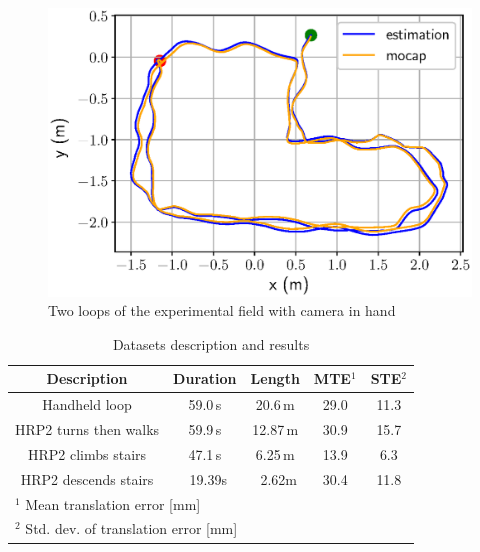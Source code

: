 \begin{figure}[t]
    \centering
    \includegraphics[scale=0.8]{figures/absolute/xy_loop_twice.eps}
    \caption{Two loops of the experimental field with camera in hand}
    \label{fig:xy_loop_twice}
\end{figure}

%
\begin{table}[t]
    \centering
    \caption{Datasets description and results}
    \begin{tabular}{c|c|c|c|c}
        Description & Duration & Length & MTE$^1$ & STE$^2$ \\
        \hline
        \hline
        Handheld loop & 59.0\,\textrm{s} & 20.6\,\textrm{m} & 29.0 & 11.3  \\
        \hline
        HRP2 turns then walks & 59.9\,\textrm{s} & 12.87\,\textrm{m} & 30.9 & 15.7 \\
        \hline
        HRP2 climbs stairs & 47.1\,\textrm{s} & 6.25\,\textrm{m} & 13.9 & 6.3 \\
        \hline
        HRP2 descends stairs & \, 19.39\textrm{s} & \, 2.62\textrm{m} & 30.4 & 11.8 \\
        \hline
        \multicolumn{5}{l}{$^1$ Mean translation error [mm]} \\
        \multicolumn{5}{l}{$^2$ Std. dev. of translation error [mm]} 
    \end{tabular}
    \label{tab:datasets}
\end{table}


